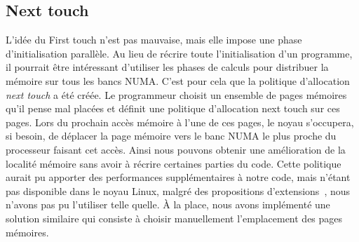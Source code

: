 \subsection{Next touch}
\label{sec:next_touch}
L'idée du First touch n'est pas mauvaise, mais elle impose une phase d'initialisation parallèle.
%
Au lieu de récrire toute l'initialisation d'un programme, il pourrait être intéressant d'utiliser les phases de calculs pour distribuer la mémoire sur tous les bancs NUMA.
%
C'est pour cela que la politique d'allocation {\em next touch} a été créée.
%
Le programmeur choisit un ensemble de pages mémoires qu'il pense mal placées et définit une politique d'allocation next touch sur ces pages.
%
Lors du prochain accès mémoire à l'une de ces pages, le noyau s'occupera, si besoin, de déplacer la page mémoire vers le banc NUMA le plus proche du processeur faisant cet accès.
%
Ainsi nous pouvons obtenir une amélioration de la localité mémoire sans avoir à récrire certaines parties du code.
%
Cette politique aurait pu apporter des performances supplémentaires à notre code, mais n'étant pas disponible dans le noyau Linux, malgré des propositions d'extensions~\cite{next_touch_linux,GoFu09Next-touch}, nous n'avons pas pu l'utiliser telle quelle.
%
\`A la place, nous avons implémenté une solution similaire qui consiste à choisir manuellement l'emplacement des pages mémoires.
